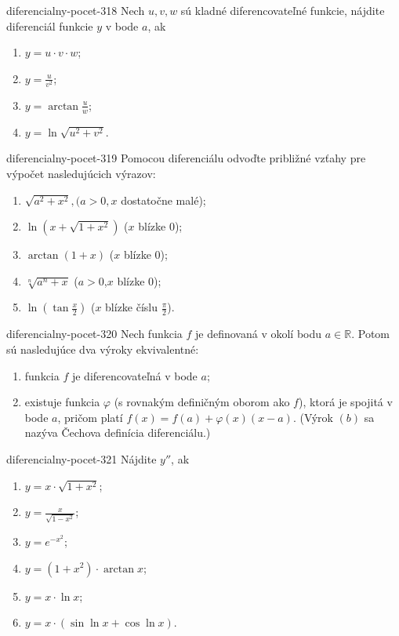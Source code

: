 \begin{defproblem}{diferencialny-pocet-318}
Nech $u,v,w$ sú kladné diferencovateľné funkcie, nájdite diferenciál funkcie $y$ v bode $a$, ak
\begin{multicols}{2}
\begin{enumerate}
    \item $y=u\cdot v\cdot w$;
    \item $y=\frac{u}{v^2}$;
    \item $y=\arctan \frac{u}{w}$;
    \item $y=\ln \sqrt{u^2+v^2}$.
\end{enumerate}
\end{multicols}
\end{defproblem}

\begin{defproblem}{diferencialny-pocet-319}
Pomocou diferenciálu odvoďte približné vzťahy pre výpočet nasledujúcich výrazov:
\begin{enumerate}
\item $\sqrt{a^2+x^2},(a>0,x$ dostatočne malé);
\item $\ln (x+\sqrt{1+x^2})$ ($x$ blízke $0$);
\item $\arctan (1+x)$ ($x$ blízke $0$);
\item $\sqrt[n]{a^n+x}$ ($a>0$,$x$ blízke $0$);
\item$\ln (\tan \frac{x}{2})$ ($x$ blízke číslu $\frac{\pi}{2}$).
\end{enumerate}
\end{defproblem}

\begin{defproblem}{diferencialny-pocet-320}
Nech funkcia $f$ je definovaná v okolí bodu $a\in\mathbb{R}$. Potom sú nasledujúce dva výroky ekvivalentné:
\begin{enumerate}
\item funkcia $f$ je diferencovateľná v bode $a$;
\item existuje funkcia $\varphi$ (s rovnakým definičným oborom ako $f$), ktorá je spojitá v bode $a$, pričom platí $f(x)=f(a)+\varphi(x)(x-a)$.
(Výrok $(b)$ sa nazýva Čechova definícia diferenciálu.)
\end{enumerate}
\end{defproblem}

\begin{defproblem}{diferencialny-pocet-321}
Nájdite $y''$, ak
\begin{multicols}{2}
\begin{enumerate}
    \item $y=x\cdot \sqrt{1+x^2}$;
    \item $y=\frac{x}{\sqrt{1-x^2}}$;
    \item $y=e^{-x^2}$;
    \item $y=(1+x^2)\cdot \arctan x$;
    \item $y=x\cdot \ln x$;
    \item $y=x\cdot(\sin \ln x+\cos \ln x)$.
\end{enumerate}
\end{multicols}
\end{defproblem}

